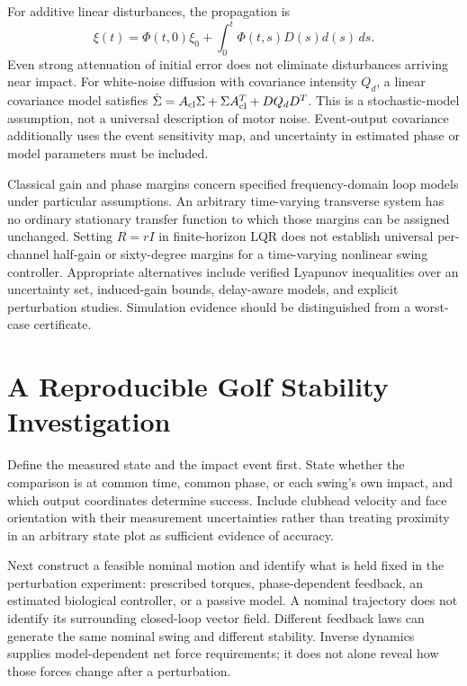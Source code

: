 \documentclass[12pt, openany]{book}
\theoremstyle{plain}
\begin{document}
For additive linear disturbances, the propagation is
\begin{equation}\label{eq:orbital_disturbance}
 \xi(t)=\Phi(t,0)\xi_0+
       \int_0^t\Phi(t,s)D(s)d(s)\,ds.
\end{equation}
Even strong attenuation of initial error does not eliminate disturbances
arriving near impact. For white-noise diffusion with covariance intensity
$Q_d$, a linear covariance model satisfies
$\dot\Sigma=A_{\rm cl}\Sigma+\Sigma A_{\rm cl}^T+DQ_dD^T$.
This is a stochastic-model assumption, not a universal description of motor
noise. Event-output covariance additionally uses the event sensitivity map,
and uncertainty in estimated phase or model parameters must be included.

Classical gain and phase margins concern specified frequency-domain loop
models under particular assumptions. An arbitrary time-varying transverse
system has no ordinary stationary transfer function to which those margins
can be assigned unchanged. Setting $R=rI$ in finite-horizon LQR does not
establish universal per-channel half-gain or sixty-degree margins for a
time-varying nonlinear swing controller. Appropriate alternatives include
verified Lyapunov inequalities over an uncertainty set, induced-gain bounds,
delay-aware models, and explicit perturbation studies. Simulation evidence
should be distinguished from a worst-case certificate.

\section{A Reproducible Golf Stability Investigation}

Define the measured state and the impact event first. State whether the
comparison is at common time, common phase, or each swing's own impact, and
which output coordinates determine success. Include clubhead velocity and
face orientation with their measurement uncertainties rather than treating
proximity in an arbitrary state plot as sufficient evidence of accuracy.

Next construct a feasible nominal motion and identify what is held fixed in
the perturbation experiment: prescribed torques, phase-dependent feedback,
an estimated biological controller, or a passive model. A nominal trajectory
does not identify its surrounding closed-loop vector field. Different
feedback laws can generate the same nominal swing and different stability.
Inverse dynamics supplies model-dependent net force requirements; it does
not alone reveal how those forces change after a perturbation.
\end{document}
